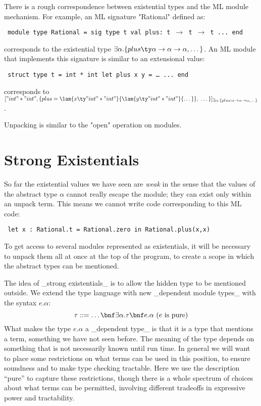 There is a rough correspondence between existential types and the ML
module mechanism.  For example, an ML signature "Rational" defined as:
\begin{small}
\begin{code}
\tt
   module type Rational =
   sig
     type t
     val plus: t $\to$ t $\to$ t
     ...
   end
\end{code}
\end{small}
corresponds to the existential type
$\exists\alpha.\{plus\ty \alpha\to\alpha\to\alpha, \dots\}$. An ML module
that implements this signature is similar to an extensional value:
\begin{small}
\begin{code}
\tt
   struct
     type t = int * int
     let plus x y = \dots
     ...
   end
\end{code}
\end{small}
corresponds to
$["int"*"int", \{plus =
\lam{x\ty "int"*"int"}{\lam{y\ty"int"*"int"}{\dots}},~\dots\}]_{\exists\alpha.\{plus: \alpha\to\alpha\to\alpha, \dots\}}
$.

Unpacking is similar to the "open" operation on modules.

\section{Strong Existentials}

So far the existential values we have seen are \emph{weak} in the sense
that the values of the abstract type $\alpha$ cannot really escape the
module; they can exist only within an unpack term. This means we cannot
write code corresponding to this ML code:

\begin{small}
\begin{code}
\tt
   let x : Rational.t = Rational.zero in
      Rational.plus(x,x)
\end{code}
\end{small}

To get access to several modules represented as existentials, it will
be necessary to unpack them all at once at the top of the program, to
create a scope in which the abstract types can be mentioned.

The idea of _strong existentials_ is to allow the hidden type to be
mentioned outside. We extend the type language with new _dependent
module types_ with the syntax $e.\alpha$:
\[
\tau ::= \dots \bnf \exists\alpha.\tau \bnf e.\alpha\ \text{($e$ is pure)}
\]
What makes the type $e.\alpha$ a _dependent type_ is that it is a type that
mentions a term, something we have not seen before. The meaning of the
type depends on something that is not necessarily known until run
time. In general we will want to place some restrictions on what terms
can be used in this position, to ensure soundness and to make type
checking tractable. Here we use the description ``pure'' to capture
these restrictions, though there is a whole spectrum of choices about what terms can
be permitted, involving different tradeoffs in expressive power and
tractability.

